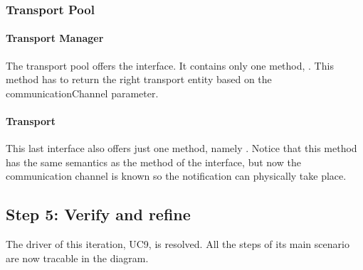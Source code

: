 \subsubsection{Transport Pool}

\paragraph{Transport Manager}

\npar The transport pool offers the  interface. It
contains only one method, . This method has to return the right transport entity based on the
communicationChannel parameter.

\paragraph{Transport}

\npar This last interface also offers just one method, namely
. Notice that this method has the same semantics as the
method of the  interface, but now the communication
channel is known so the notification can physically take place.

\subsection{Step 5: Verify and refine}
\label{add:it7/verification}

\npar The driver of this iteration, UC9, is resolved. All the steps of its main
scenario are now tracable in the diagram.

